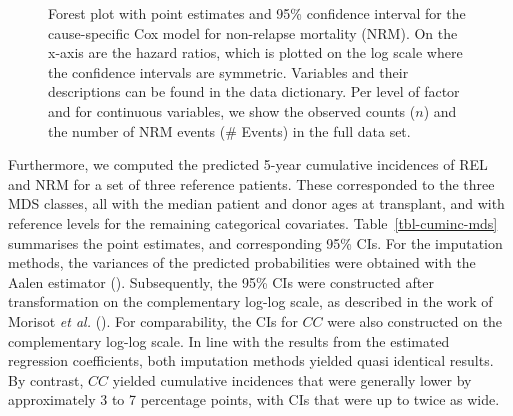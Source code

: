 \documentclass[
  letterpaper,
  DIV=11,
  numbers=noendperiod]{scrreprt}
\begin{document}
\begin{figure}


\caption{\label{fig-forest-nrm}Forest plot with point estimates and 95\%
confidence interval for the cause-specific Cox model for non-relapse
mortality (NRM). On the x-axis are the hazard ratios, which is plotted
on the log scale where the confidence intervals are symmetric. Variables
and their descriptions can be found in the data dictionary. Per level of
factor and for continuous variables, we show the observed counts (\(n\))
and the number of NRM events (\# Events) in the full data set.}

\end{figure}%

Furthermore, we computed the predicted 5-year cumulative incidences of
REL and NRM for a set of three reference patients. These corresponded to
the three MDS classes, all with the median patient and donor ages at
transplant, and with reference levels for the remaining categorical
covariates. Table~\ref{tbl-cuminc-mds} summarises the point estimates,
and corresponding 95\% CIs. For the imputation methods, the variances of
the predicted probabilities were obtained with the Aalen estimator
(). Subsequently, the 95\% CIs were constructed after
transformation on the complementary log-log scale, as described in the
work of Morisot \emph{et al.}
(). For comparability,
the CIs for \(CC\) were also constructed on the complementary log-log
scale. In line with the results from the estimated regression
coefficients, both imputation methods yielded quasi identical results.
By contrast, \(CC\) yielded cumulative incidences that were generally
lower by approximately 3 to 7 percentage points, with CIs that were up
to twice as wide.
\end{document}
